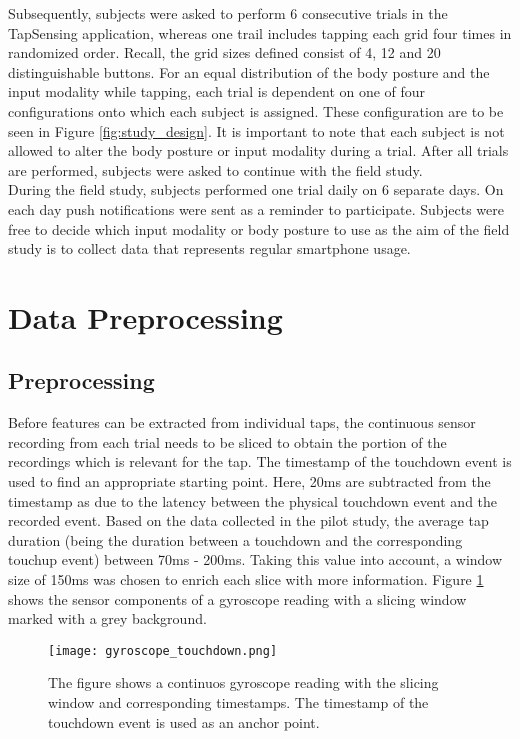 Subsequently, subjects were asked to perform 6 consecutive trials in the TapSensing application, whereas one trail includes tapping each grid four times in randomized order. Recall, the grid sizes defined consist of 4, 12 and 20 distinguishable buttons. For an equal distribution of the body posture and the input modality while tapping, each trial is dependent on one of four configurations onto which each subject is assigned. These configuration are to be seen in Figure \ref{fig:study_design}.  It is important to note that each subject is not allowed to alter the body posture or input modality during a trial. After all trials are performed, subjects were asked to continue with the field study.\\

During the field study, subjects performed one trial daily on 6 separate days. On each day push notifications were sent as a reminder to participate. Subjects were free to decide which input modality or body posture to use as the aim of the field study is to collect data that represents regular smartphone usage.

\section{Data Preprocessing \label{cha:chapter4}}
\subsection{Preprocessing}
Before features can be extracted from individual taps, the continuous sensor recording from each trial needs to be sliced to obtain the portion of the recordings which is relevant for the tap. The timestamp of the touchdown event is used to find an appropriate starting point. Here, 20ms are subtracted from the timestamp as due to the latency between the physical touchdown event and the recorded event. Based on the data collected in the pilot study, the average tap duration (being the duration between a touchdown and the corresponding touchup event) between 70ms - 200ms. Taking this value into account, a window size of 150ms was chosen to enrich each slice with more information. Figure \ref{fig:touchdown} shows the sensor components of a gyroscope reading with a slicing window marked with a grey background. 

\begin{figure}[h!]
  \centering
  \texttt{[image: gyroscope\_touchdown.png]}
  \caption{The figure shows a continuos gyroscope reading with the slicing window and corresponding timestamps. The timestamp of the touchdown event is used as an anchor point.} \label{fig:touchdown}
\end{figure}

